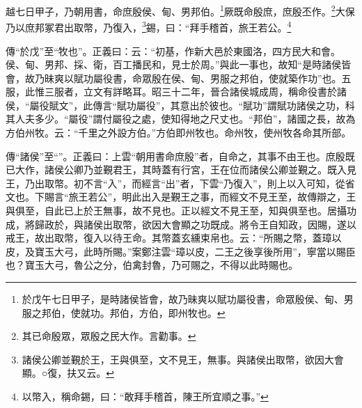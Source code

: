 越七日甲子，乃朝用書，命庶殷侯、甸、男邦伯。\footnote{於戊午七日甲子，是時諸侯皆會，故乃昧爽以賦功屬役書，命眾殷侯、甸、男服之邦伯，使就功。邦伯，方伯，即州牧也。}厥既命殷庶，庶殷丕作。\footnote{其已命殷眾，眾殷之民大作。言勸事。}大保乃以庶邦冢君出取幣，乃復入，\footnote{諸侯公卿並覲於王，王與俱至，文不見王，無事。與諸侯出取幣，欲因大會顯。○復，扶又云。}錫，曰：“拜手稽首，旅王若公。\footnote{以幣入，稱命錫，曰：“敢拜手稽首，陳王所宜順之事。”}

{\noindent\zhuan{}\fzbyks 傳“於戊”至“牧也”。正義曰：云：“初基，作新大邑於東國洛，四方民大和會。侯、甸、男邦、採、衛，百工播民和，見士於周。”與此一事也，故知“是時諸侯皆會，故乃昧爽以賦功屬役書，命眾殷在侯、甸、男服之邦伯，使就築作功”也。五服，此惟三服者，立文有詳略耳。昭三十二年，晉合諸侯城成周，稱命役書於諸侯，“屬役賦文”，此傳言“賦功屬役”，其意出於彼也。“賦功”謂賦功諸侯之功，科其人夫多少。“屬役”謂付屬役之處，使知得地之尺丈也。“邦伯”，諸國之長，故為方伯州牧。云：“千里之外設方伯。”方伯即州牧也。命州牧，使州牧各命其所部。 \par}

{\noindent\zhuan{}\fzbyks 傳“諸侯”至“”。正義曰：上雲“朝用書命庶殷”者，自命之，其事不由王也。庶殷既已大作，諸侯公卿乃並覲君王，其時蓋有行宮，王在位而諸侯公卿並覲之。既入見王，乃出取幣。初不言“入”，而經言“出”者，下雲“乃復入”，則上以入可知，從省文也。下賜言“旅王若公”，明此出入是覲王之事，而經文不見王至，故傳辯之，王與俱至，自此已上於王無事，故不見也。正以經文不見王至，知與俱至也。居攝功成，將歸政於，與諸侯出取幣，欲因大會顯之功既成。將令王自知政，因賜，遂以戒王，故出取幣，復入以待王命。其幣蓋玄纁束帛也。云：“所賜之幣，蓋璋以皮，及寶玉大弓，此時所賜。”案鄭注雲“璋以皮，二王之後享後所用”，寧當以賜臣也？寶玉大弓，魯公之分，伯禽封魯，乃可賜之，不得以此時賜也。 \par}

